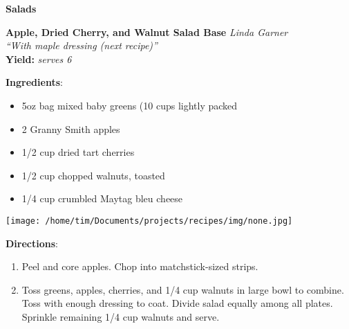 \documentclass[11pt, twoside, openany]{book}
\begin{document}
{\newpage \LARGE \textbf{Salads}} \label{salads}\\
\noindent\begin{minipage}[t]{\linewidth}%
{\Large\textbf{Apple, Dried Cherry, and Walnut Salad Base}} \label{apple,-dried-cherry,-and-walnut-salad-base}\hfill\textit{Linda Garner}\\
\textit{``With maple dressing (next recipe)''}\\
\textbf{Yield:} \textit{serves 6}\\
\noindent\begin{minipage}[t]{0.78\linewidth}%
\textbf{Ingredients}:\vspace{-3mm}
\begin{multicols}{2}
\begin{itemize}\setlength\itemsep{-1mm}
\item 5oz bag mixed baby greens (10 cups lightly packed
\item 2 Granny Smith apples
\item 1/2 cup dried tart cherries
\item 1/2 cup chopped walnuts, toasted
\item 1/4 cup crumbled Maytag bleu cheese
\end{itemize}
\end{multicols}
\end{minipage}
\noindent\begin{minipage}[t]{0.18\linewidth}
\centering \strut\vspace*{-\baselineskip}\newline
\texttt{[image: /home/tim/Documents/projects/recipes/img/none.jpg]}\\
\end{minipage}\vspace{3mm}
\textbf{Directions}:
\vspace{-3mm}\begin{enumerate}\setlength\itemsep{-1mm}
\item Peel and core apples. Chop into matchstick-sized strips.
\item Toss greens, apples, cherries, and 1/4 cup walnuts in large bowl to combine. Toss with enough dressing to coat. Divide salad equally among all plates. Sprinkle remaining 1/4 cup walnuts and serve.
\end{enumerate}
\end{minipage}\vspace{8mm}
\end{document}
